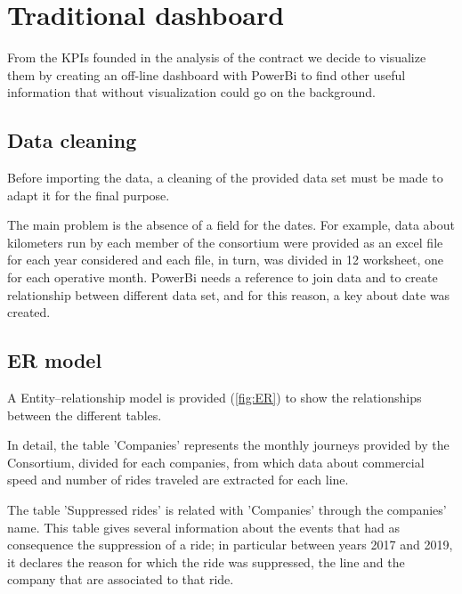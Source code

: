 \chapter{Traditional dashboard}
From the KPIs founded in the analysis of the contract we decide to visualize them by creating an off-line dashboard with PowerBi to find other useful information that without visualization could go on the background.

\section{Data cleaning}
Before importing the data, a cleaning of the provided data set must be made to adapt it for the final purpose. 

The main problem is the absence of a field for the dates. For example, data about kilometers run by each member of the consortium were provided as an excel file for each year considered and each file, in turn, was divided in 12 worksheet, one for each operative month. PowerBi needs a reference to join data and to create relationship between different data set, and for this reason, a key about date was created.  

\section{ER model}
A Entity–relationship model is provided (\ref{fig:ER}) to show the relationships between the different tables.

In detail, the table 'Companies' represents the monthly journeys provided by the Consortium, divided for each companies, from which data about commercial speed and number of rides traveled are extracted for each line. 

The table 'Suppressed rides' is related with 'Companies' through the companies' name. This table gives several information about the events that had as consequence the suppression of a ride; in particular between years 2017 and 2019, it declares the reason for which the ride was suppressed, the line and the company that are associated to that ride. 

